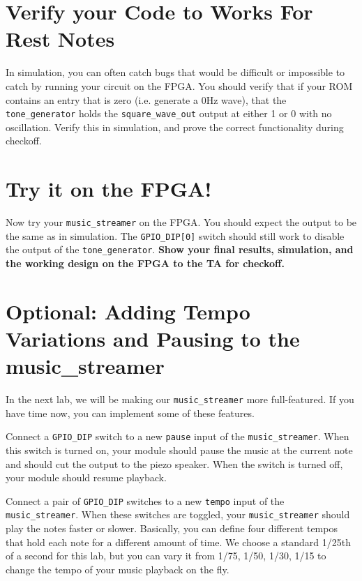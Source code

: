 \documentclass[11pt]{article}
\begin{document}
\section{Verify your Code to Works For Rest Notes}
In simulation, you can often catch bugs that would be difficult or impossible to catch by running your circuit on the FPGA. You should verify that if your ROM contains an entry that is zero (i.e. generate a 0Hz wave), that the \verb|tone_generator| holds the \verb|square_wave_out| output at either 1 or 0 with no oscillation. Verify this in simulation, and prove the correct functionality during checkoff.

\section{Try it on the FPGA!}
Now try your \verb|music_streamer| on the FPGA. You should expect the output to be the same as in simulation. The \verb|GPIO_DIP[0]| switch should still work to disable the output of the \verb|tone_generator|. \textbf{Show your final results, simulation, and the working design on the FPGA to the TA for checkoff.}

\section{Optional: Adding Tempo Variations and Pausing to the music\_streamer}
In the next lab, we will be making our \verb|music_streamer| more full-featured. If you have time now, you can implement some of these features.

Connect a \verb|GPIO_DIP| switch to a new \verb|pause| input of the \verb|music_streamer|. When this switch is turned on, your module should pause the music at the current note and should cut the output to the piezo speaker. When the switch is turned off, your module should resume playback.

Connect a pair of \verb|GPIO_DIP| switches to a new \verb|tempo| input of the \verb|music_streamer|. When these switches are toggled, your \verb|music_streamer| should play the notes faster or slower. Basically, you can define four different tempos that hold each note for a different amount of time. We choose a standard 1/25th of a second for this lab, but you can vary it from 1/75, 1/50, 1/30, 1/15 to change the tempo of your music playback on the fly.
\end{document}
